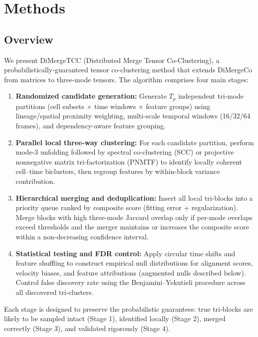 \documentclass[unnumsec,webpdf,modern,large,namedate]{oup-authoring-template}%
\theoremstyle{thmstyleone}\newtheorem{theorem}{Theorem}
\theoremstyle{thmstyletwo}\newtheorem{example}{Example}
\theoremstyle{thmstylethree}\newtheorem{definition}{Definition}
\begin{document}
\section{Methods}\label{sec:methods}

\subsection{Overview}
We present DiMergeTCC (Distributed Merge Tensor Co-Clustering), a probabilistically-guaranteed tensor co-clustering method that extends DiMergeCo from matrices to three-mode tensors. The algorithm comprises four main stages:

\begin{enumerate}
\item \textbf{Randomized candidate generation:} Generate $T_p$ independent tri-mode partitions (cell subsets $\times$ time windows $\times$ feature groups) using lineage/spatial proximity weighting, multi-scale temporal windows (16/32/64 frames), and dependency-aware feature grouping.

\item \textbf{Parallel local three-way clustering:} For each candidate partition, perform mode-3 unfolding followed by spectral co-clustering (SCC) or projective nonnegative matrix tri-factorization (PNMTF) to identify locally coherent cell--time biclusters, then regroup features by within-block variance contribution.

\item \textbf{Hierarchical merging and deduplication:} Insert all local tri-blocks into a priority queue ranked by composite score (fitting error + regularization). Merge blocks with high three-mode Jaccard overlap only if per-mode overlaps exceed thresholds and the merger maintains or increases the composite score within a non-decreasing confidence interval.

\item \textbf{Statistical testing and FDR control:} Apply circular time shifts and feature shuffling to construct empirical null distributions for alignment scores, velocity biases, and feature attributions (augmented nulls described below). Control false discovery rate using the Benjamini--Yekutieli procedure across all discovered tri-clusters.
\end{enumerate}

Each stage is designed to preserve the probabilistic guarantees: true tri-blocks are likely to be sampled intact (Stage 1), identified locally (Stage 2), merged correctly (Stage 3), and validated rigorously (Stage 4).
\end{document}
